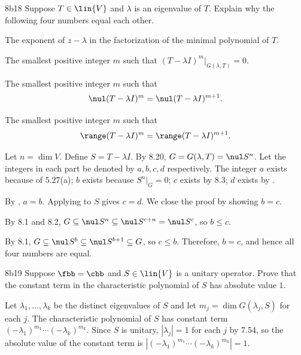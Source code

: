 \begin{exercise}{8b18}
    Suppose $T \in \lin{V}$ and $\lambda$ is an eigenvalue of $T$.
    Explain why the following four numbers equal each other.
    \begin{subexercises}
        \item The exponent of $z - \lambda$ in the factorization of the minimal polynomial of $T$.
        \item The smallest positive integer $m$ such that $(T - \lambda I)^m|_{G(\lambda, T)} = 0$.
        \item The smallest positive integer $m$ such that
        \[
            \nul(T - \lambda I)^m = \nul(T - \lambda I)^{m+1}.
        \]
        \item The smallest positive integer $m$ such that
        \[
            \range(T - \lambda I)^m = \range(T - \lambda I)^{m+1}.
        \]
    \end{subexercises}
\end{exercise}

\begin{sol}
    Let $n = \dim V$.
    Define $S = T - \lambda I$.
    By 8.20, $G = G(\lambda, T) = \nul S^n$.
    Let the integers in each part be denoted by $a, b, c, d$ respectively.
    The integer $a$ exists because of 5.27(a); $b$ exists because $S^n|_G = 0$; $c$ exists by 8.3; $d$ exists by .

    By , $a = b$.
    Applying  to $S$ gives $c = d$.
    We close the proof by showing $b = c$.
    
    \rightineq By 8.1 and 8.2, $G \subseteq \nul S^n \subseteq \nul S^{c+n} = \nul S^c$, so $b \leq c$.

    \leftineq By 8.1, $G \subseteq \nul S^b \subseteq \nul S^{b+1} \subseteq G$, so $c \leq b$.
    Therefore, $b = c$, and hence all four numbers are equal.
\end{sol}

\begin{exercise}{8b19}
    Suppose $\fbb = \cbb$ and $S \in \lin{V}$ is a unitary operator.
    Prove that the constant term in the characteristic polynomial of $S$ has absolute value $1$.
\end{exercise}

\begin{sol}
    Let $\lambda_1, \ldots, \lambda_k$ be the distinct eigenvalues of $S$ and let $m_j = \dim G(\lambda_j, S)$ for each $j$.
    The characteristic polynomial of $S$ has constant term $(-\lambda_1)^{m_1} \cdots (-\lambda_k)^{m_k}$.
    Since $S$ is unitary, $|\lambda_j| = 1$ for each $j$ by 7.54, so the absolute value of the constant term is $|(-\lambda_1)^{m_1} \cdots (-\lambda_k)^{m_k}| = 1$.
\end{sol}

